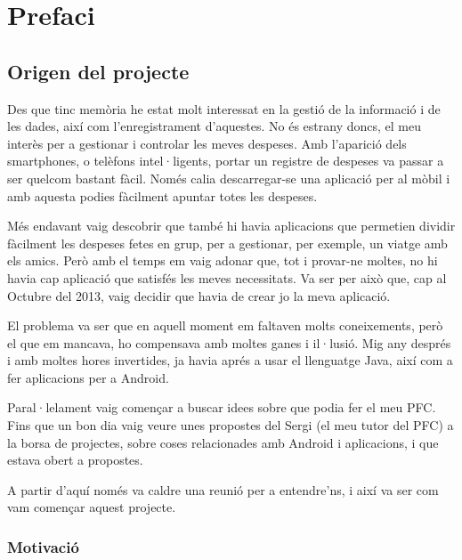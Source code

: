 \chapter{Prefaci} \label{Prefaci}

\section{Origen del projecte} \label{OrigenDelProjecte}
Des que tinc memòria he estat molt interessat en la gestió de la informació i de les dades, així com l'enregistrament d'aquestes. No és estrany doncs, el meu interès per a gestionar i controlar les meves despeses. Amb l'aparició dels \glspl{smartphone}, o telèfons intel·ligents, portar un registre de despeses va passar a ser quelcom bastant fàcil. Només calia descarregar-se una aplicació per al mòbil i amb aquesta podies fàcilment apuntar totes les despeses. 

Més endavant vaig descobrir que també hi havia aplicacions que permetien dividir fàcilment les despeses fetes en grup, per a gestionar, per exemple, un viatge amb els amics. Però amb el temps em vaig adonar que, tot i provar-ne moltes, no hi havia cap aplicació que satisfés les meves necessitats. Va ser per això que, cap al Octubre del 2013, vaig decidir que havia de crear jo la meva aplicació.

El problema va ser que en aquell moment em faltaven molts coneixements, però el que em mancava, ho compensava amb moltes ganes i il·lusió. Mig any després i amb moltes hores invertides, ja havia aprés a usar el llenguatge Java, així com a fer aplicacions per a \gls{Android}. 

Paral·lelament vaig començar a buscar idees sobre que podia fer el meu \ac{PFC}. Fins que un bon dia vaig veure unes propostes del Sergi (el meu tutor del \ac{PFC}) a la borsa de projectes, sobre coses relacionades amb \gls{Android} i aplicacions, i que estava obert a propostes. 

A partir d'aquí només va caldre una reunió per a entendre'ns, i així va ser com vam començar aquest projecte. 


\subsection{Motivació} \label{Motivacio}


